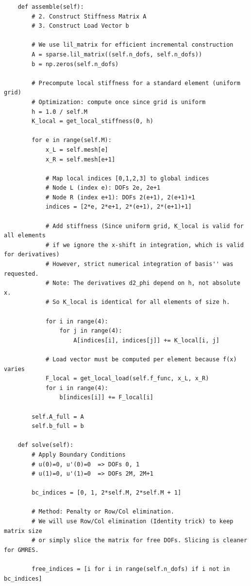 \documentclass{hw-template}
\begin{document}
\begin{verbatim}
    def assemble(self):
        # 2. Construct Stiffness Matrix A
        # 3. Construct Load Vector b
        
        # We use lil_matrix for efficient incremental construction
        A = sparse.lil_matrix((self.n_dofs, self.n_dofs))
        b = np.zeros(self.n_dofs)
        
        # Precompute local stiffness for a standard element (uniform grid)
        # Optimization: compute once since grid is uniform
        h = 1.0 / self.M
        K_local = get_local_stiffness(0, h)
        
        for e in range(self.M):
            x_L = self.mesh[e]
            x_R = self.mesh[e+1]
            
            # Map local indices [0,1,2,3] to global indices
            # Node L (index e): DOFs 2e, 2e+1
            # Node R (index e+1): DOFs 2(e+1), 2(e+1)+1
            indices = [2*e, 2*e+1, 2*(e+1), 2*(e+1)+1]
            
            # Add stiffness (Since uniform grid, K_local is valid for all elements 
            # if we ignore the x-shift in integration, which is valid for derivatives)
            # However, strict numerical integration of basis'' was requested. 
            # Note: The derivatives d2_phi depend on h, not absolute x.
            # So K_local is identical for all elements of size h.
            
            for i in range(4):
                for j in range(4):
                    A[indices[i], indices[j]] += K_local[i, j]
            
            # Load vector must be computed per element because f(x) varies
            F_local = get_local_load(self.f_func, x_L, x_R)
            for i in range(4):
                b[indices[i]] += F_local[i]
                
        self.A_full = A
        self.b_full = b
        
    def solve(self):
        # Apply Boundary Conditions
        # u(0)=0, u'(0)=0  => DOFs 0, 1
        # u(1)=0, u'(1)=0  => DOFs 2M, 2M+1
        
        bc_indices = [0, 1, 2*self.M, 2*self.M + 1]
        
        # Method: Penalty or Row/Col elimination. 
        # We will use Row/Col elimination (Identity trick) to keep matrix size
        # or simply slice the matrix for free DOFs. Slicing is cleaner for GMRES.
        
        free_indices = [i for i in range(self.n_dofs) if i not in bc_indices]
        

\end{verbatim}
\end{document}
